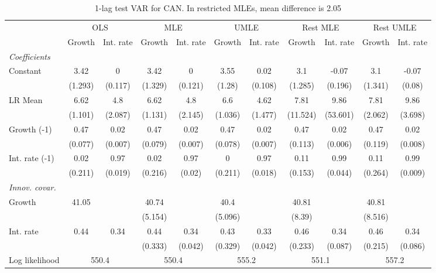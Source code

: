 \begin{table}[htbp] 
	\centering
	\begin{tabular}{@{\extracolsep{4pt}}lcccccccccc@{}}		\hline\hline
		 		 & \multicolumn{2}{c}{OLS} &\multicolumn{2}{c}{MLE} &\multicolumn{2}{c}{UMLE} &\multicolumn{2}{c}{Rest MLE} &\multicolumn{2}{c}{Rest UMLE} \\ 
 		 & Growth 	 & Int. rate 	 & Growth 	 & Int. rate 	 & Growth 	 & Int. rate 	 & Growth 	 & Int. rate 	 & Growth 	 & Int. rate\\\cline{2-3}\cline{4-5}\cline{6-7}\cline{8-9}\cline{10-11}
\rule{0pt}{4ex} 
 \emph{Coefficients} 	  		 & 		 & 		 & 		 & 		 & 		 & 		 & 		 & 		 & 		 &\\ 
\quad Constant 	 & 3.42 	 & 0 	 & 3.42 	 & 0 	 & 3.55 	 & 0.02 	 & 3.1 	 & -0.07 	 & 3.1 	 & -0.07	 \\ 
 		 & (1.293) 	 & (0.117) 	 & (1.329) 	 & (0.121) 	 & (1.28) 	 & (0.108) 	 & (1.285) 	 & (0.196) 	 & (1.341) 	 & (0.08) 	 \\ 
\quad LR Mean 	 & 6.62 	 & 4.8 	 & 6.62 	 & 4.8 	 & 6.6 	 & 4.62 	 & 7.81 	 & 9.86 	 & 7.81 	 & 9.86	 \\ 
 		 & (1.101) 	 & (2.087) 	 & (1.131) 	 & (2.145) 	 & (1.036) 	 & (1.477) 	 & (11.524) 	 & (53.601) 	 & (2.062) 	 & (3.698) 	 \\ 
\quad Growth (-1) 	 &0.47 	 & 0.02 	 & 0.47 	 & 0.02 	 & 0.47 	 & 0.02 	 & 0.47 	 & 0.02 	 & 0.47 	 & 0.02	 \\ 
 		 & (0.077) 	 & (0.007) 	 & (0.079) 	 & (0.007) 	 & (0.078) 	 & (0.007) 	 & (0.113) 	 & (0.006) 	 & (0.119) 	 & (0.008) 	 \\ 
\quad Int. rate (-1) 	 &0.02 	 & 0.97 	 & 0.02 	 & 0.97 	 & 0 	 & 0.97 	 & 0.11 	 & 0.99 	 & 0.11 	 & 0.99	 \\ 
 		 & (0.211) 	 & (0.019) 	 & (0.216) 	 & (0.02) 	 & (0.211) 	 & (0.018) 	 & (0.153) 	 & (0.044) 	 & (0.264) 	 & (0.009) 	 \\ 
\rule{0pt}{4ex} \emph{Innov. covar.}  	 & 	 & 	 & 	 & 	 & 	 & 	 & 	 & 	 & 	 &\\ 
\quad Growth 	 &41.05 	 &  	 & 40.74 	 &  	 & 40.4 	 &  	 & 40.81 	 &  	 & 40.81 	 & 	 \\ 
 		 &  	 &  	 & (5.154) 	 &  	 & (5.096) 	 &  	 & (8.39) 	 &  	 & (8.516) 	 &  	 \\ 
\quad Int. rate 	 &0.44 	 & 0.34 	 & 0.44 	 & 0.34 	 & 0.43 	 & 0.33 	 & 0.46 	 & 0.34 	 & 0.46 	 & 0.34	 \\ 
 		 &  	 &  	 & (0.333) 	 & (0.042) 	 & (0.329) 	 & (0.042) 	 & (0.233) 	 & (0.087) 	 & (0.215) 	 & (0.086) 	 \\ 
 \hline \rule{0pt}{4ex} 
  Log likelihood 	 &\multicolumn{2}{c}{550.4} 	 & \multicolumn{2}{c}{550.4} 	 & \multicolumn{2}{c}{555.2} 	 & \multicolumn{2}{c}{551.1} 	 & \multicolumn{2}{c}{557.2}\\ 

 \hline 	\end{tabular}		\caption{1-lag test VAR for CAN. In restricted MLEs, mean difference is 2.05}
		\label{tab:CAN1}

\end{table}